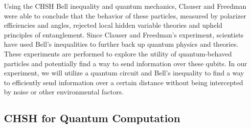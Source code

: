 \documentclass{article}
\begin{document}
Using the CHSH Bell inequality and quantum mechanics, Clauser and Freedman were able to conclude that the behavior of these particles, measured by polarizer efficiencies and angles, rejected local hidden variable theories and upheld principles of entanglement. 
Since Clauser and Freedman’s experiment, scientists have used Bell’s inequalities to further back up quantum physics and theories. These experiments are performed to explore the utility of quantum-behaved particles and potentially find a way to send information over these qubits. In our experiment, we will utilize a quantum circuit and Bell’s inequality to find a way to efficiently send information over a certain distance without being intercepted by noise or other environmental factors. 


\subsection{CHSH for Quantum Computation}



\end{document}
